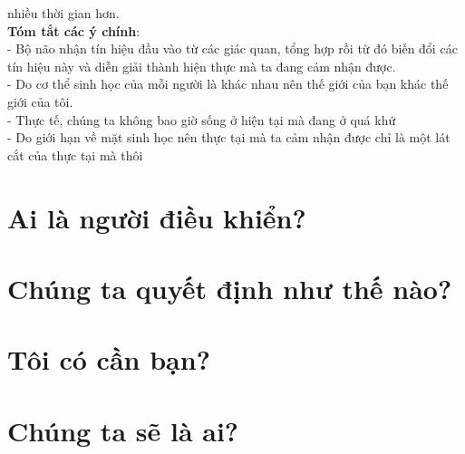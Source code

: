 \documentclass{article}
\newcommand\tab[1][1cm]{\hspace*{#1}}
\begin{document}
 nhiều thời gian hơn.\\
 \tab \textbf{Tóm tắt các ý chính}: \\
\tab\tab - Bộ não nhận tín hiệu đầu vào từ các giác quan, tổng hợp rồi từ đó biến đổi các tín hiệu này 
và diễn giải thành hiện thực mà ta đang cảm nhận được.\\
\tab\tab - Do cơ thể sinh học của mỗi người là khác nhau nên thế giới của bạn khác thế giới của tôi.\\
\tab\tab - Thực tế, chúng ta không bao giờ sống ở hiện tại mà đang ở quá khứ\\
\tab\tab - Do giới hạn về mặt sinh học nên thực tại mà ta cảm nhận được chỉ là một
lát cắt của thực tại mà thôi\\


\section{Ai là người điều khiển?}
\section{Chúng ta quyết định như thế nào?}
\section{Tôi có cần bạn?}
\section{Chúng ta sẽ là ai?}
\end{document}
